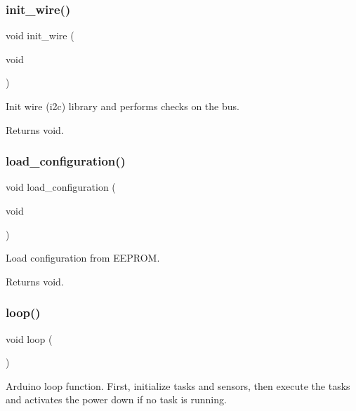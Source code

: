 \subsubsection{\texorpdfstring{init\+\_\+wire()}{init\_wire()}}
{\footnotesize\ttfamily void init\+\_\+wire (\begin{DoxyParamCaption}\item[{void}]{ }\end{DoxyParamCaption})}



Init wire (i2c) library and performs checks on the bus. 

\begin{DoxyReturn}{Returns}
void. 
\end{DoxyReturn}
\mbox{\label{rmap_8ino_a32a64a2800c724fb28e10636f2ec20b9}} 
\subsubsection{\texorpdfstring{load\+\_\+configuration()}{load\_configuration()}}
{\footnotesize\ttfamily void load\+\_\+configuration (\begin{DoxyParamCaption}\item[{void}]{ }\end{DoxyParamCaption})}



Load configuration from E\+E\+P\+R\+OM. 

\begin{DoxyReturn}{Returns}
void. 
\end{DoxyReturn}
\mbox{\label{rmap_8ino_afe461d27b9c48d5921c00d521181f12f}} 
\subsubsection{\texorpdfstring{loop()}{loop()}}
{\footnotesize\ttfamily void loop (\begin{DoxyParamCaption}{ }\end{DoxyParamCaption})}



Arduino loop function. First, initialize tasks and sensors, then execute the tasks and activates the power down if no task is running. 

